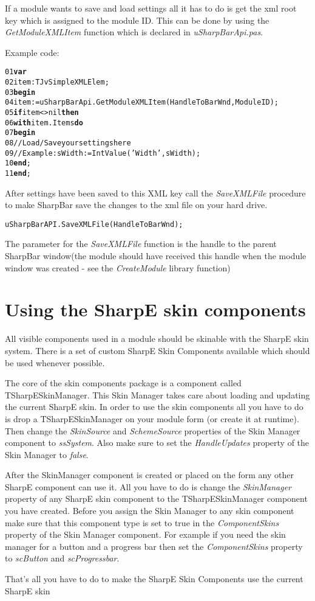 \documentclass[a4paper]{article}
\begin{document}
  If a module wants to save and load settings all it has to do is get the xml root key which is assigned to the module ID. This can be done by using the {\it GetModuleXMLItem} function which is declared in {\it uSharpBarApi.pas}. 

  Example code: 
\begin{alltt}
01  {\bf var}
02    item : TJvSimpleXMLElem;
03  {\bf begin}
04    item := uSharpBarApi.GetModuleXMLItem(HandleToBarWnd,ModuleID);
05    {\bf if} item <> nil {\bf then}
06    {\bf with} item.Items {\bf do}
07    {\bf begin}
08      // Load/Save your settings here
09      // Example: sWidth := IntValue('Width',sWidth);
10    {\bf end};
11 {\bf end};
\end{alltt}

  After settings have been saved to this XML key call the {\it SaveXMLFile} procedure to make SharpBar save the changes to the xml file on your hard drive. 

  \verb+uSharpBarAPI.SaveXMLFile(HandleToBarWnd);+

  The parameter for the {\it SaveXMLFile} function is the handle to the parent SharpBar window(the module should have received this handle when the module window was created - see the {\it CreateModule} library function)

\newpage
\section{Using the SharpE skin components}
All visible components used in a module should be skinable with the SharpE skin system. There is a set of custom SharpE Skin Components available which should be used whenever possible. 

The core of the skin components package is a component called TSharpESkinManager. This Skin Manager takes care about loading and updating the current SharpE skin. In order to use the skin components all you have to do is drop a TSharpESkinManager on your module form (or create it at runtime). Then change the {\it SkinSource} and {\it SchemeSource} properties of the Skin Manager component to {\it ssSystem}. Also make sure to set the {\it HandleUpdates} property of the Skin Manager to {\it false}. 

After the SkinManager component is created or placed on the form any other SharpE component can use it. All you have to do is change the {\it SkinManager} property of any SharpE skin component to the TSharpESkinManager component you have created. Before you assign the Skin Manager to any skin component make sure that this component type is set to true in the {\it ComponentSkins} property of the Skin Manager component. For example if you need the skin manager for a button and a progress bar then set the {\it ComponentSkins} property to {\it scButton} and {\it scProgressbar}. 

That's all you have to do to make the SharpE Skin Components use the current SharpE skin
  
\end{document}
